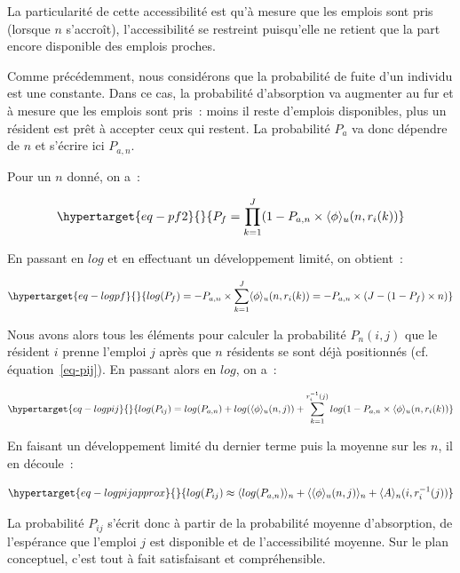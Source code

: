 \documentclass[
  10pt,
  a4paper,
  numbers=noendperiod,
  DIV=9]{scrreprt}
\begin{document}
La particularité de cette accessibilité est qu'à mesure que les emplois
sont pris (lorsque \(n\) s'accroît), l'accessibilité se restreint
puisqu'elle ne retient que la part encore disponible des emplois
proches.

Comme précédemment, nous considérons que la probabilité de fuite d'un
individu est une constante. Dans ce cas, la probabilité d'absorption va
augmenter au fur et à mesure que les emplois sont pris~: moins il reste
d'emplois disponibles, plus un résident est prêt à accepter ceux qui
restent. La probabilité \(P_a\) va donc dépendre de \(n\) et s'écrire
ici \(P_{a,n}\).

Pour un \(n\) donné, on a~:

\begin{equation}\protect\hypertarget{eq-pf2}{}{
P_f=\prod_{k=1}^J(1-P_{a,n}\times \langle \phi \rangle_u(n, r_i(k))
}\label{eq-pf2}\end{equation}

En passant en \(log\) et en effectuant un développement limité, on
obtient~:

\begin{equation}\protect\hypertarget{eq-logpf}{}{
log(P_f)=-P_{a,n}\times\sum_{k=1}^J \langle \phi \rangle_u(n,r_i(k))=-P_{a,n}\times(J-(1-P_f)\times n)
}\label{eq-logpf}\end{equation}

Nous avons alors tous les éléments pour calculer la probabilité
\(P_n(i,j)\) que le résident \(i\) prenne l'emploi \(j\) après que \(n\)
résidents se sont déjà positionnés (cf. équation~\ref{eq-pij}). En
passant alors en \(log\), on a~:

\begin{equation}\protect\hypertarget{eq-logpij}{}{
log(P_{ij})=log(P_{a,n})+log(\langle\phi \rangle_u(n,j))+\sum_{k=1}^{r_i^{-1}(j)}log(1-P_{a,n}\times \langle \phi \rangle_u(n,r_i(k))
}\label{eq-logpij}\end{equation}

En faisant un développement limité du dernier terme puis la moyenne sur
les \(n\), il en découle~:

\begin{equation}\protect\hypertarget{eq-logpijapprox}{}{
log(P_{ij})\approx\langle log(P_{a,n})\rangle _n+\langle\langle\phi\rangle_u(n,j)\rangle_n + \langle A\rangle_n(i, r_i^{-1}(j))
}\label{eq-logpijapprox}\end{equation}

La probabilité \(P_{ij}\) s'écrit donc à partir de la probabilité
moyenne d'absorption, de l'espérance que l'emploi \(j\) est disponible
et de l'accessibilité moyenne. Sur le plan conceptuel, c'est tout à fait
satisfaisant et compréhensible.
\end{document}
